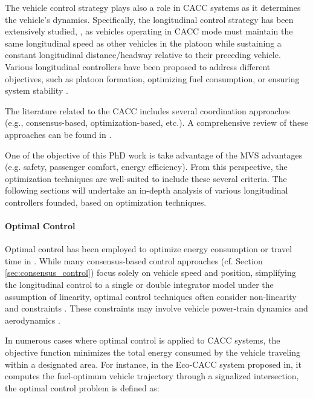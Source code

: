         
The vehicle control strategy plays also a role in CACC systems as it determines the vehicle's dynamics. Specifically, the longitudinal control strategy has been extensively studied, \cite{wang2018review}\cite{dey2015review}\cite{nowakowski2010cooperative}, as vehicles operating in CACC mode must maintain the same longitudinal speed as other vehicles in the platoon while sustaining a constant longitudinal distance/headway relative to their preceding vehicle. Various longitudinal controllers have been proposed to address different objectives, such as platoon formation, optimizing fuel consumption, or ensuring system stability \cite{moser2017flexible}\cite{nie2020adaptive}. 

The literature related to the CACC includes several coordination approaches (e.g., consensus-based, optimization-based, etc.). A comprehensive review of these approaches can be found in \cite{wang2018review}\cite{dey2015review}\cite{liu2023systematic}.


One of the objective of this PhD work is take advantage of the MVS advantages (e.g. safety, passenger comfort, energy efficiency). From this perspective, the optimization techniques are well-suited to include these several criteria.  The following sections will undertake an in-depth analysis of various longitudinal controllers founded, based on optimization techniques.


\paragraph{Optimal Control} \label{sec: optimal-control} 

Optimal control has been employed to optimize energy consumption or travel time in \cite{massera2017safe}. While many consensus-based control approaches (cf. Section \ref{sec:consensus_control}) focus solely on vehicle speed and position, simplifying the longitudinal control to a single or double integrator model under the assumption of linearity, optimal control techniques often consider non-linearity and constraints \cite{wang2018review}\cite{dey2015review}\cite{shao2017robust}. These constraints may involve vehicle power-train dynamics and aerodynamics \cite{turri2018fuel}. 

In numerous cases where optimal control is applied to CACC systems, the objective function minimizes the total energy consumed by the vehicle traveling within a designated area. For instance, in the Eco-CACC system proposed in\cite{yang2016eco}, it computes the fuel-optimum vehicle trajectory through a signalized intersection, the optimal control problem is defined as: 


